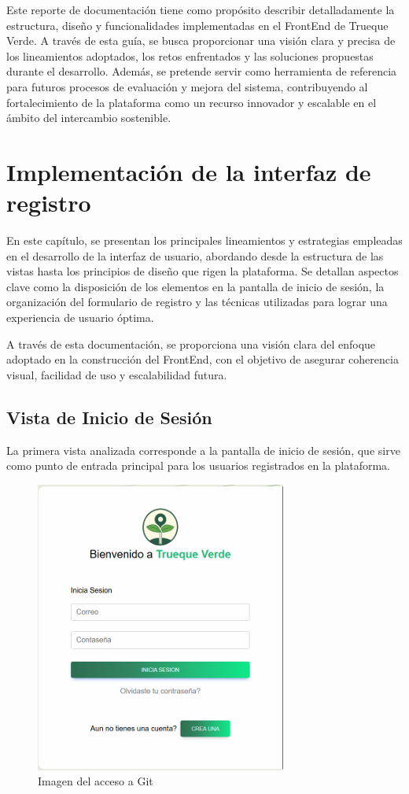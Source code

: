 \documentclass[11pt, a4paper, oneside]{book}
\begin{document}
Este reporte de documentación tiene como propósito describir detalladamente la estructura, diseño y funcionalidades implementadas en el FrontEnd de Trueque Verde. A través de esta guía, se busca proporcionar una visión clara y precisa de los lineamientos adoptados, los retos enfrentados y las soluciones propuestas durante el desarrollo. Además, se pretende servir como herramienta de referencia para futuros procesos de evaluación y mejora del sistema, contribuyendo al fortalecimiento de la plataforma como un recurso innovador y escalable en el ámbito del intercambio sostenible.


\chapter{Implementación de la interfaz de registro}

En este capítulo, se presentan los principales lineamientos y estrategias empleadas en el desarrollo de la interfaz de usuario, abordando desde la estructura de las vistas hasta los principios de diseño que rigen la plataforma. Se detallan aspectos clave como la disposición de los elementos en la pantalla de inicio de sesión, la organización del formulario de registro y las técnicas utilizadas para lograr una experiencia de usuario óptima.


A través de esta documentación, se proporciona una visión clara del enfoque adoptado en la construcción del FrontEnd, con el objetivo de asegurar coherencia visual, facilidad de uso y escalabilidad futura.

 
\section{Vista de Inicio de Sesión }
 La primera vista analizada corresponde a la
 pantalla de inicio de sesión, que sirve como
 punto de entrada principal para los usuarios
 registrados en la plataforma.

\begin{figure}[H]
    \centering
    \includegraphics[width=0.55
    \linewidth]{Pictures/Bienvenido.png }
        \caption{Imagen del acceso a Git}

\end{figure}
\end{document}
